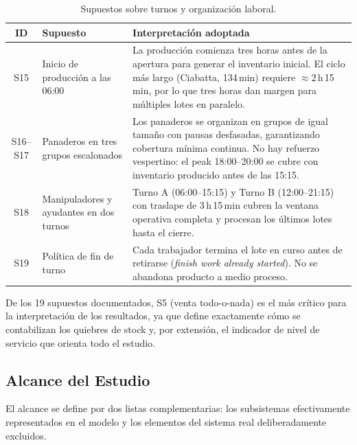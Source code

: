 \documentclass[10pt, a4paper]{article}
\begin{document}
\begin{table}[H]
\centering
\caption{Supuestos sobre turnos y organizaci\'on laboral.}
\label{tab:supuestos_turnos}
\renewcommand{\arraystretch}{1.30}
\begin{tabularx}{\textwidth}{c >{\raggedright\arraybackslash}p{3.5cm} X}
\toprule
\rowcolor{azulClaro}
\textbf{ID} & \textbf{Supuesto} & \textbf{Interpretaci\'on adoptada} \\
\midrule
S15 & Inicio de producci\'on a las 06:00
    & La producci\'on comienza tres horas antes de la apertura para generar
      el inventario inicial. El ciclo m\'as largo (Ciabatta, 134\,min)
      requiere $\approx 2$\,h\,15\,min, por lo que tres horas dan margen para
      m\'ultiples lotes en paralelo. \\
\rowcolor{grisClaro}
S16--S17 & Panaderos en tres grupos escalonados
    & Los panaderos se organizan en grupos de igual tama\~no con pausas
      desfasadas, garantizando cobertura m\'inima continua. No hay refuerzo
      vespertino: el peak 18:00--20:00 se cubre con inventario producido
      antes de las 15:15. \\
S18 & Manipuladores y ayudantes en dos turnos
    & Turno A (06:00--15:15) y Turno B (12:00--21:15) con traslape de
      3\,h\,15\,min cubren la ventana operativa completa y procesan los
      \'ultimos lotes hasta el cierre. \\
\rowcolor{grisClaro}
S19 & Pol\'itica de fin de turno
    & Cada trabajador termina el lote en curso antes de retirarse
      (\emph{finish work already started}). No se abandona producto a medio
      proceso. \\
\bottomrule
\end{tabularx}
\end{table}

De los 19 supuestos documentados, S5 (venta todo-o-nada) es el m\'as cr\'itico
para la interpretaci\'on de los resultados, ya que define exactamente c\'omo
se contabilizan los quiebres de stock y, por extensi\'on, el indicador de
nivel de servicio que orienta todo el estudio.

\subsection{Alcance del Estudio}
\label{ssec:alcance}

El alcance se define por dos listas complementarias: los subsistemas
efectivamente representados en el modelo y los elementos del sistema real
deliberadamente excluidos.
\end{document}
